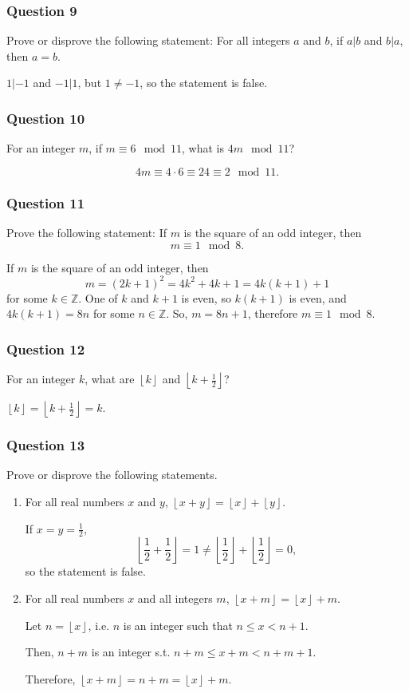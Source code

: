 \documentclass{beamer}
\newcommand{\floor}[1]{\left\lfloor #1 \right\rfloor}
\begin{document}
\begin{frame}
\frametitle{Question 9}
Prove or disprove the following statement: For all integers $a$ and $b$, if
$a|b$ and $b|a$, then $a = b$.

\pause
$1 | -1$ and $-1 | 1$, but $1 \neq -1$, so the statement is false.
\end{frame}

\begin{frame}
\frametitle{Question 10}
For an integer $m$, if $m \equiv 6 \mod 11$, what is $4m \mod 11$?

\pause
\[
    4m \equiv 4 \cdot 6 \equiv 24 \equiv 2 \mod 11.
\]
\end{frame}

\begin{frame}
\frametitle{Question 11}
Prove the following statement: If $m$ is the square of an odd integer, then
\[ m \equiv 1 \mod 8. \]

\pause
If $m$ is the square of an odd integer, then
\[
    m = (2k+1)^2 = 4k^2 + 4k + 1 = 4k(k+1) + 1
\]
for some $k \in \mathbb{Z}$.
\pause
One of $k$ and $k+1$ is even, so $k(k+1)$ is even, and $4k(k+1) = 8n$ for some
$n \in \mathbb{Z}$.
\pause
So, $m = 8n + 1$, therefore $m \equiv 1 \mod 8$.
\end{frame}

\begin{frame}
\frametitle{Question 12}
For an integer $k$, what are $\floor{k}$ and $\floor{k + \frac{1}{2}}$?

\pause
$\floor{k} = \floor{k+\frac{1}{2}} = k$.

\end{frame}

\begin{frame}
\frametitle{Question 13}
Prove or disprove the following statements.
\begin{enumerate}
\item
For all real numbers $x$ and $y$, $\floor{x + y} = \floor{x} + \floor{y}$.

\pause
If $x = y = \frac{1}{2}$,
\[
    \floor{\frac{1}{2} + \frac{1}{2}} = 1
    \neq \floor{\frac{1}{2}} + \floor{\frac{1}{2}} = 0,
\]
so the statement is false.
\pause
\item
For all real numbers $x$ and all integers $m$, $\floor{x+m} = \floor{x} + m$.

\pause
Let $n = \floor{x}$, i.e. $n$ is an integer such that $n \leq x < n + 1$.

\pause
Then, $n + m$ is an integer s.t. $n + m \leq x + m < n + m + 1$.

\pause
Therefore, $\floor{x + m} = n + m = \floor{x} + m$.

\end{enumerate}


\end{frame}
\end{document}
